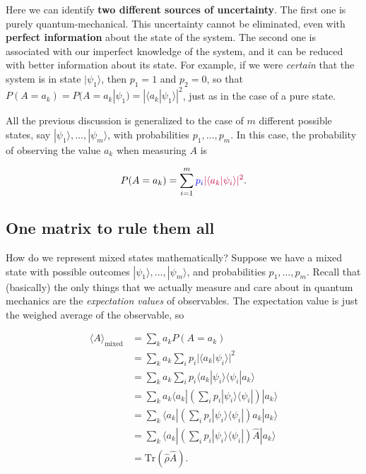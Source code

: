 \documentclass[a4]{article}
\begin{document}
Here we can identify \textbf{two different sources of uncertainty}.{\color{purple} The
first one is purely quantum-mechanical. This uncertainty cannot be
eliminated, even with \textbf{perfect information} about the state of
the system}. {\color{blue}The second one is associated with our imperfect knowledge of
the system, and it can be reduced with better information about its
state}. For example, if we were \emph{certain} that the system is in
state $|\psi_1\rangle$, then $p_1=1$ and $p_2=0$, so that
$P(A=a_k) = P(A=a_k|\psi_1) = |\langle a_k | \psi_1\rangle|^2$, just
as in the case of a pure state.

All the previous discussion is generalized to the case of $m$
different possible states, say $|\psi_1\rangle,\dots,|\psi_m\rangle$,
with probabilities $p_1,\dots,p_m$. In this case, the probability of
observing the value $a_k$ when measuring $A$ is

\begin{equation*}P(A=a_k) = \sum_{i=1}^m{\color{blue} p_i}{\color{purple}|\langle a_k|\psi_i\rangle|^2}.\end{equation*}

\subsection{One matrix to rule them
all}\label{one-matrix-to-rule-them-all}

How do we represent mixed states mathematically? Suppose we have a mixed
state with possible outcomes $|\psi_1\rangle,\dots,|\psi_m\rangle$,
and probabilities $p_1,\dots,p_m$. Recall that (basically) the only
things that we actually measure and care about in quantum mechanics are
the \emph{expectation values} of observables. The expectation value is
just the weighed average of the observable, so

\begin{equation*}\begin{aligned} \langle A \rangle_{\text{mixed}} &= \sum_{k} a_k P(A=a_k)\\
  &= \sum_{k} a_k \sum_i p_i |\langle a_k | \psi_i \rangle|^2\\
  &= \sum_{k} a_k \sum_i p_i \langle a_k | \psi_i \rangle\langle \psi_i |a_k\rangle\\
  &= \sum_{k} a_k \langle a_k |\left(\sum_i p_i  |\psi_i \rangle\langle \psi_i |\right) |a_k\rangle\\
  &= \sum_{k} \langle a_k |\left(\sum_i p_i  |\psi_i \rangle\langle \psi_i |\right) a_k |a_k\rangle\\
  &= \sum_{k} \langle a_k |\left(\sum_i p_i  |\psi_i \rangle\langle \psi_i |\right) \hat{A}|a_k\rangle\\
  &= \mathrm{Tr}\left(\hat{\rho}\hat{A}\right). \end{aligned}\end{equation*}
\end{document}
